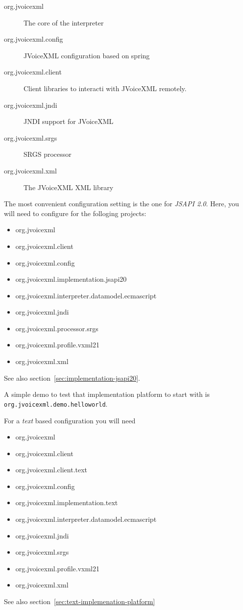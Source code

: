 \documentclass[11pt,a4paper]{article}
\begin{document}
\begin{description}
\item[org.jvoicexml] The core of the interpreter
\item[org.jvoicexml.config] JVoiceXML configuration based on spring
\item[org.jvoicexml.client] Client libraries to interacti with JVoiceXML
remotely.
\item[org.jvoicexml.jndi] JNDI support for JVoiceXML
\item[org.jvoicexml.srgs] SRGS processor 
\item[org.jvoicexml.xml] The JVoiceXML XML library 
\end{description}

The most convenient configuration setting is the one for \emph{JSAPI 2.0}. Here,
you will need to configure for the folloging projects:
\begin{itemize}
  \item org.jvoicexml
  \item org.jvoicexml.client
  \item org.jvoicexml.config
  \item org.jvoicexml.implementation.jsapi20
  \item org.jvoicexml.interpreter.datamodel.ecmascript
  \item org.jvoicexml.jndi
  \item org.jvoicexml.processor.srgs
  \item org.jvoicexml.profile.vxml21
  \item org.jvoicexml.xml
\end{itemize}
See also section~\ref{sec:implementation-jsapi20}.

A simple demo to test that implementation platform to start with is
\lstinline{org.jvoicexml.demo.helloworld}.

For a \emph{text} based configuration you will need
\begin{itemize}
  \item org.jvoicexml
  \item org.jvoicexml.client
  \item org.jvoicexml.client.text
  \item org.jvoicexml.config
  \item org.jvoicexml.implementation.text
  \item org.jvoicexml.interpreter.datamodel.ecmascript
  \item org.jvoicexml.jndi
  \item org.jvoicexml.srgs
  \item org.jvoicexml.profile.vxml21
  \item org.jvoicexml.xml
\end{itemize}
See also section~\ref{sec:text-implemenation-platform}
\end{document}
